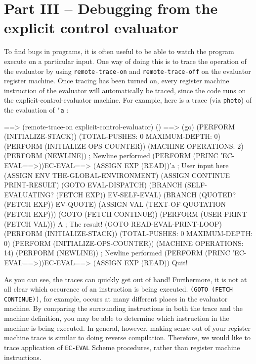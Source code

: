 \chapter{Part III -- Debugging from the explicit control evaluator}

To find bugs in programs, it is often useful to be able to watch the
program execute on a particular input.  One way of doing this is to trace 
the operation of the evaluator by using {\tt remote-trace-on} and 
{\tt remote-trace-off} on the evaluator register machine.  Once tracing
has been turned on, every register machine instruction of the evaluator will
automatically be traced, since the code runs on the explicit-control-evaluator 
machine.  For example, here is a trace (via {\tt photo}) of the evaluation of 
{\tt 'a} : 

 ==> (remote-trace-on explicit-control-evaluator)
() 
 ==> (go)
(PERFORM (INITIALIZE-STACK))
(TOTAL-PUSHES: 0 MAXIMUM-DEPTH: 0) 
(PERFORM (INITIALIZE-OPS-COUNTER))
(MACHINE OPERATIONS: 2) 
(PERFORM (NEWLINE))
                                                 ; Newline performed
(PERFORM (PRINC 'EC-EVAL==>))EC-EVAL==>
(ASSIGN EXP (READ))'a                            ; User input here
\pbrk
(ASSIGN ENV THE-GLOBAL-ENVIRONMENT)
(ASSIGN CONTINUE PRINT-RESULT)
(GOTO EVAL-DISPATCH)
(BRANCH (SELF-EVALUATING? (FETCH EXP)) EV-SELF-EVAL)
(BRANCH (QUOTED? (FETCH EXP)) EV-QUOTE)
(ASSIGN VAL (TEXT-OF-QUOTATION (FETCH EXP)))
(GOTO (FETCH CONTINUE))
(PERFORM (USER-PRINT (FETCH VAL)))
A                                                ; The result!
(GOTO READ-EVAL-PRINT-LOOP)
(PERFORM (INITIALIZE-STACK))
(TOTAL-PUSHES: 0 MAXIMUM-DEPTH: 0) 
(PERFORM (INITIALIZE-OPS-COUNTER))
(MACHINE OPERATIONS: 14) 
(PERFORM (NEWLINE))
                                                 ; Newline performed
(PERFORM (PRINC 'EC-EVAL==>))EC-EVAL==>
(ASSIGN EXP (READ))
Quit!
\endlisp

As you can see, the traces can quickly get out of hand! Furthermore,
it is not at all clear which occurence of an instruction is being
executed.  {\tt (GOTO (FETCH CONTINUE))}, for example,
occurs at many different places in the evaluator machine.  By
comparing the surrounding instructions in both the trace and the machine
definition, you may be able to determine which instruction in the
machine is being executed.  In general, however, making sense out of your 
register machine trace is similar to doing reverse compilation.
Therefore, we would like to trace application of 
{\tt EC-EVAL} Scheme procedures, rather than register machine instructions.  

